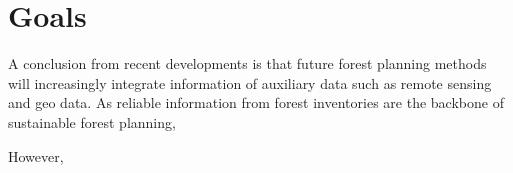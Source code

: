 \section{Goals}
\label{sec:intro:goal}
\newpage

A conclusion from recent developments is that future forest planning methods will increasingly integrate information of auxiliary data such as remote sensing and geo data. As reliable information from forest inventories are the backbone of sustainable forest planning, 

However, 

%
% 
%
%
%
















